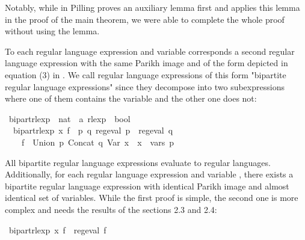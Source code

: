 \begin{isabellebody}
\begin{isamarkuptext}
Notably, while in \cite{Pilling} Pilling proves an auxiliary lemma first and applies this lemma in
the proof of the main theorem, we were able to complete the whole proof without using the lemma.%
\end{isamarkuptext}\isamarkuptrue%
%
\isadelimdocument
%
\endisadelimdocument
%
\isatagdocument
%
\isamarkuptrue%
%
\endisatagdocument
{\isafolddocument}%
%
\isadelimdocument
%
\endisadelimdocument
%
\begin{isamarkuptext}%
To each regular language expression and variable  corresponds a second regular language
expression with the same Parikh image and of the form depicted in equation (3) in \cite{Pilling}.
We call regular language expressions of this form "bipartite regular language expressions" since
they decompose into two subexpressions where one of them contains the variable  and the other
one does not:%
\end{isamarkuptext}\isamarkuptrue%
\isamarkupfalse%
\ bipart{\isacharunderscore}{\kern0pt}rlexp\ {\isacharcolon}{\kern0pt}{\isacharcolon}{\kern0pt}\ {\isachardoublequoteopen}nat\ {\isasymRightarrow}\ {\isacharprime}{\kern0pt}a\ rlexp\ {\isasymRightarrow}\ bool{\isachardoublequoteclose}\ \isanewline
\ \ {\isachardoublequoteopen}bipart{\isacharunderscore}{\kern0pt}rlexp\ x\ f\ {\isasymequiv}\ {\isasymexists}p\ q{\isachardot}{\kern0pt}\ reg{\isacharunderscore}{\kern0pt}eval\ p\ {\isasymand}\ reg{\isacharunderscore}{\kern0pt}eval\ q\ {\isasymand}\isanewline
\ \ \ \ f\ {\isacharequal}{\kern0pt}\ Union\ p\ {\isacharparenleft}{\kern0pt}Concat\ q\ {\isacharparenleft}{\kern0pt}Var\ x{\isacharparenright}{\kern0pt}{\isacharparenright}{\kern0pt}\ {\isasymand}\ x\ {\isasymnotin}\ vars\ p{\isachardoublequoteclose}%
\begin{isamarkuptext}%
All bipartite regular language expressions evaluate to regular languages. Additionally,
for each  regular language expression and variable , there exists a bipartite
regular language expression with identical Parikh image and almost identical set of variables.
While the first proof is simple, the second one is more complex and needs the results of the
sections 2.3 and 2.4:%
\end{isamarkuptext}\isamarkuptrue%
\isamarkupfalse%
\ {\isachardoublequoteopen}bipart{\isacharunderscore}{\kern0pt}rlexp\ x\ f\ {\isasymLongrightarrow}\ reg{\isacharunderscore}{\kern0pt}eval\ f{\isachardoublequoteclose}\isanewline

\end{isabellebody}
